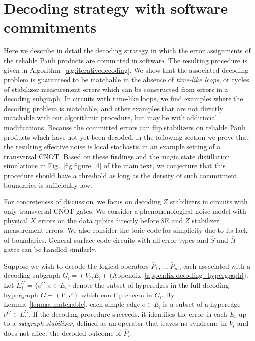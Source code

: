 \documentclass[prx,twocolumn,secnumarabic,balancelastpage,amsmath,amssymb,longbibliography]{revtex4-2}
\newcommand{\lop}[1]{\overline{#1}}
\newcommand{\lcnot}{\overline{\text{CNOT}}}
\begin{document}
\section{Decoding strategy with software commitments \label{appendix:software_commitments}}
Here we describe in detail the decoding strategy in which the error assignments of the reliable Pauli products are committed in software.
%
The resulting procedure is given in Algorithm~\ref{alg:iterativedecoding}.
%
We show that the associated decoding problem is guaranteed to be matchable in the absence of \textit{time-like loops}, or cycles of stabilizer measurement errors which can be constructed from errors in a decoding subgraph.
%
In circuits with time-like loops, we find examples where the decoding problem is matchable, and other examples that are not directly matchable with our algorithmic procedure, but may be with additional modifications.
% 
Because the committed errors can flip stabilizers on reliable Pauli products which have not yet been decoded, in the following section we prove that the resulting effective noise is local stochastic in an example setting of a transversal $\lcnot$.
%
Based on these findings and the magic state distillation simulations in Fig.~\ref{fig:figure_4} of
the main text, we conjecture that this procedure should have a threshold as long as the density of such commitment boundaries is sufficiently low. 

For concreteness of discussion, we focus on decoding $Z$ stabilizers in circuits with only transversal $\lcnot$ gates.
%
We consider a phenomenological noise model with physical $X$ errors on the data qubits directly before SE and $Z$ stabilizer measurement errors.
%
We also consider the toric code for simplicity due to its lack of boundaries.
%
General surface code circuits with all error types and $\lop{S}$ and $\lop{H}$ gates can be handled similarly.

Suppose we wish to decode the logical operators $\lop P_1, \dots, \lop P_m$, each associated with a decoding subgraph $G_i = (V_i, E_i)$ (Appendix~\ref{appendix:decoding_hypergraph}). 
%
Let \mbox{$E^G_i = \{e^G: e\in E_i\}$} denote the subset of hyperedges in the full decoding hypergraph $G=(V, E)$ which can flip checks in $G_i$. 
%
By Lemma~\ref{lemma:matchable}, each simple edge $e\in E_i$ is a subset of a hyperedge $e^G\in E^G_i$.
%
If the decoding procedure succeeds, it identifies the error in each $E_i$ up to a \textit{subgraph stabilizer}, defined as an operator that leaves no syndrome in $V_i$ and does not affect the decoded outcome of $\lop P_i$.
\end{document}
